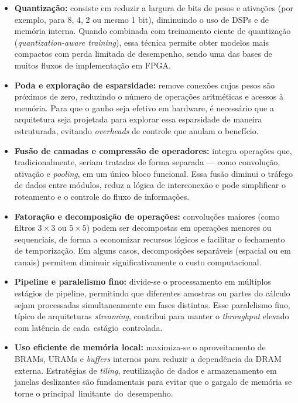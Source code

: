 \begin{itemize}
	\item \textbf{Quantização:} consiste em reduzir a largura de bits de pesos e ativações (por exemplo, para 8, 4, 2 ou mesmo 1 bit), diminuindo o uso de DSPs e de memória interna. Quando combinada com treinamento ciente de quantização (\textit{quantization-aware training}), essa técnica permite obter modelos mais compactos com perda limitada de desempenho, sendo uma das bases de muitos fluxos de implementação em FPGA.
	
	\item \textbf{Poda e exploração de esparsidade:} remove conexões cujos pesos são próximos de zero, reduzindo o número de operações aritméticas e acessos à memória. Para que o ganho seja efetivo em hardware, é necessário que a arquitetura seja projetada para explorar essa esparsidade de maneira estruturada, evitando \textit{overheads} de controle que anulam o benefício.
	
	\item \textbf{Fusão de camadas e compressão de operadores:} integra operações que, tradicionalmente, seriam tratadas de forma separada — como convolução, ativação e \textit{pooling}, em um único bloco funcional. Essa fusão diminui o tráfego de dados entre módulos, reduz a lógica de interconexão e pode simplificar o roteamento e o controle do fluxo de informações.
	
	\item \textbf{Fatoração e decomposição de operações:} convoluções maiores (como filtros \(3\times3\) ou \(5\times5\)) podem ser decompostas em operações menores ou sequenciais, de forma a economizar recursos lógicos e facilitar o fechamento de temporização. Em alguns casos, decomposições separáveis (espacial ou em canais) permitem diminuir significativamente o custo computacional.
	
	\item \textbf{Pipeline e paralelismo fino:} divide-se o processamento em múltiplos estágios de pipeline, permitindo que diferentes amostras ou partes do cálculo sejam processadas simultaneamente em fases distintas. Esse paralelismo fino, típico de arquiteturas \textit{streaming}, contribui para manter o \textit{throughput} elevado com latência de \mbox{cada estágio controlada.}
	
	\item \textbf{Uso eficiente de memória local:} maximiza-se o aproveitamento de BRAMs, URAMs e \textit{buffers} internos para reduzir a dependência da DRAM externa. Estratégias de \textit{tiling}, reutilização de dados e armazenamento em janelas deslizantes são fundamentais para evitar que o gargalo de memória se torne o \mbox{principal limitante do desempenho.}
	

\end{itemize}
